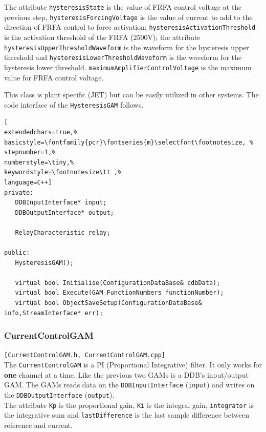 The attribute \texttt{hysteresisState} is the value of FRFA control voltage at the previous step, \texttt{hysteresisForcingVoltage} is the value of current to add to the direction of FRFA control to force activation; \texttt{hysteresisActivationThreshold} is the activation threshold of the FRFA (2500V); the attribute \texttt{hysteresisUpperThresholdWaveform} is the waveform for the hysteresis upper threshold and \texttt{hysteresisLowerThresholdWaveform} is the waveform for the hysteresis lower threshold. \texttt{maximumAmplifierControlVoltage} is the maximum value for FRFA control voltage.

This class is plant specific (JET) but can be easily utilized in other systems. The code interface of the \texttt{HysteresisGAM} follows.

\begin{lstlisting}[
extendedchars=true,%
basicstyle=\fontfamily{pcr}\fontseries{m}\selectfont\footnotesize, %
stepnumber=1,%
numberstyle=\tiny,%
keywordstyle=\footnotesize\tt ,%
language=C++]
private:
   DDBInputInterface* input;
   DDBOutputInterface* output;

   RelayCharacteristic relay;

public:
   HysteresisGAM();

   virtual bool Initialise(ConfigurationDataBase& cdbData);
   virtual bool Execute(GAM_FunctionNumbers functionNumber);
   virtual bool ObjectSaveSetup(ConfigurationDataBase& info,StreamInterface* err);
\end{lstlisting}



\subsubsection{CurrentControlGAM}
\texttt{[CurrentControlGAM.h, CurrentControlGAM.cpp]} \\
The \texttt{CurrentControlGAM} is a PI (Proportional Integrative) filter. It only works for \textbf{one} channel at a time. Like the previous two GAMs is a DDB's input/output GAM. The GAMs reads data on the \texttt{DDBInputInterface} (\texttt{input}) and writes on the \texttt{DDBOutputInterface} (\texttt{output}). \\


The attribute \texttt{Kp} is the proportional gain, \texttt{Ki} is the integral gain, \texttt{integrator} is the integrative sum and \texttt{lastDifference} is the last sample difference between reference and current.

